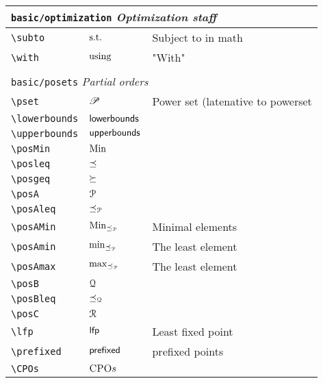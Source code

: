 \begin{longtable}{lll}
 \multicolumn{3}{l}{{\color[rgb]{0.5,0.5,0.5}\texttt{basic/optimization}} \emph{Optimization staff}}\\ 
 \hline
{\color[rgb]{0.5,0.5,0.5}\texttt{\textbackslash subto}} & $\text{s.t.}$ &  Subject to in math\\ 
 {\color[rgb]{0.5,0.5,0.5}\texttt{\textbackslash with}} & $\text{using}$ &  "With"\\ 
  &  & \\ 
 \multicolumn{3}{l}{{\color[rgb]{0.5,0.5,0.5}\texttt{basic/posets}} \emph{Partial orders}}\\ 
 \hline
{\color[rgb]{0.5,0.5,0.5}\texttt{\textbackslash pset}} & $\mathscr{P}$ &  Power set (latenative to powerset\\ 
 {\color[rgb]{0.5,0.5,0.5}\texttt{\textbackslash lowerbounds}} & $\mathsf{lowerbounds}$ & \\ 
 {\color[rgb]{0.5,0.5,0.5}\texttt{\textbackslash upperbounds}} & $\mathsf{upperbounds}$ & \\ 
 {\color[rgb]{0.5,0.5,0.5}\texttt{\textbackslash posMin}} & $\operatorname*{Min}$ & \\ 
 {\color[rgb]{0.5,0.5,0.5}\texttt{\textbackslash posleq}} & $\preceq$ & \\ 
 {\color[rgb]{0.5,0.5,0.5}\texttt{\textbackslash posgeq}} & $\succeq$ & \\ 
 {\color[rgb]{0.5,0.5,0.5}\texttt{\textbackslash posA}} & $\mathcal{P}$ & \\ 
 {\color[rgb]{0.5,0.5,0.5}\texttt{\textbackslash posAleq}} & $\mathrel{{\preceq_{\mathcal{P}}}}$ & \\ 
 {\color[rgb]{0.5,0.5,0.5}\texttt{\textbackslash posAMin}} & $\mathop{{\operatorname*{Min}_{\mathrel{{\preceq_{\mathcal{P}}}}}}}$ &   Minimal elements\\ 
 {\color[rgb]{0.5,0.5,0.5}\texttt{\textbackslash posAmin}} & $\mathop{{\min_{\mathrel{{\preceq_{\mathcal{P}}}}}}}$ &   The least element\\ 
 {\color[rgb]{0.5,0.5,0.5}\texttt{\textbackslash posAmax}} & $\mathop{{\max_{\mathrel{{\preceq_{\mathcal{P}}}}}}}$ &   The least element\\ 
 {\color[rgb]{0.5,0.5,0.5}\texttt{\textbackslash posB}} & $\mathcal{Q}$ &  \\ 
 {\color[rgb]{0.5,0.5,0.5}\texttt{\textbackslash posBleq}} & $\mathrel{{\preceq_{\mathcal{Q}}}}$ & \\ 
 {\color[rgb]{0.5,0.5,0.5}\texttt{\textbackslash posC}} & $\mathcal{R}$ &  \\ 
 {\color[rgb]{0.5,0.5,0.5}\texttt{\textbackslash lfp}} & $\mathsf{lfp}$ &  Least fixed point \\ 
 {\color[rgb]{0.5,0.5,0.5}\texttt{\textbackslash prefixed}} & $\mathsf{prefixed}$ &  prefixed points \\ 
 {\color[rgb]{0.5,0.5,0.5}\texttt{\textbackslash CPOs}} & $\textsc{CPO}s$ & \\ 

\end{longtable}
